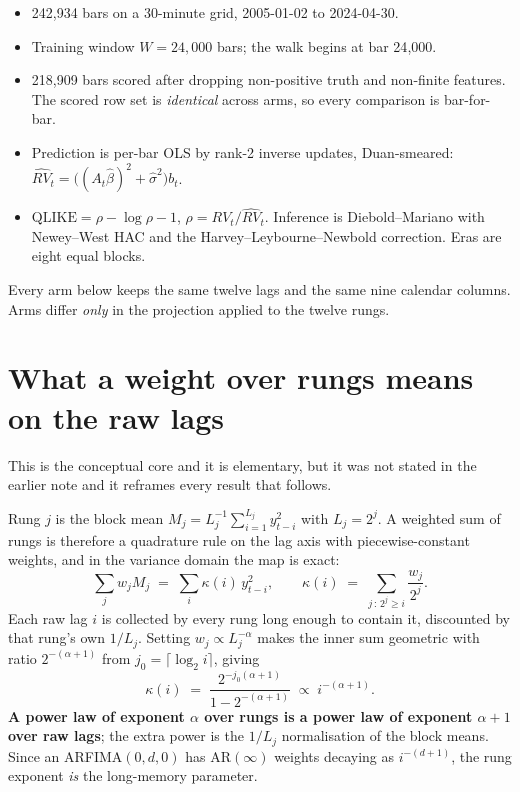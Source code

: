 \documentclass[11pt,a4paper]{article}
\begin{document}
\begin{itemize}\itemsep2pt
  \item 242{,}934 bars on a 30-minute grid, 2005-01-02 to 2024-04-30.
  \item Training window $W = 24{,}000$ bars; the walk begins at bar 24{,}000.
  \item 218{,}909 bars scored after dropping non-positive truth and
        non-finite features. The scored row set is \emph{identical} across
        arms, so every comparison is bar-for-bar.
  \item Prediction is per-bar OLS by rank-2 inverse updates, Duan-smeared:
        $\widehat{RV}_t = \big((A_t\hat\beta)^2 + \hat\sigma^2\big)b_t$.
  \item $\mathrm{QLIKE} = \rho - \log\rho - 1$, $\rho = RV_t/\widehat{RV}_t$.
        Inference is Diebold--Mariano with Newey--West HAC and the
        Harvey--Leybourne--Newbold correction. Eras are eight equal blocks.
\end{itemize}

Every arm below keeps the same twelve lags and the same nine calendar columns.
Arms differ \emph{only} in the projection applied to the twelve rungs.

\section{What a weight over rungs means on the raw lags}
\label{sec:kernel}

This is the conceptual core and it is elementary, but it was not stated in the
earlier note and it reframes every result that follows.

Rung $j$ is the block mean $M_j = L_j^{-1}\sum_{i=1}^{L_j} y^2_{t-i}$ with
$L_j = 2^j$. A weighted sum of rungs is therefore a quadrature rule on the lag
axis with piecewise-constant weights, and in the variance domain the map is
exact:
\[
  \sum_j w_j M_j \;=\; \sum_i \kappa(i)\, y^2_{t-i},
  \qquad
  \kappa(i) \;=\; \sum_{j\,:\,2^j \ge i} \frac{w_j}{2^j}.
\]
Each raw lag $i$ is collected by every rung long enough to contain it,
discounted by that rung's own $1/L_j$. Setting $w_j \propto L_j^{-\alpha}$
makes the inner sum geometric with ratio $2^{-(\alpha+1)}$ from
$j_0 = \lceil \log_2 i\rceil$, giving
\[
  \kappa(i) \;=\; \frac{2^{-j_0(\alpha+1)}}{1-2^{-(\alpha+1)}}
             \;\propto\; i^{-(\alpha+1)} .
\]
\textbf{A power law of exponent $\alpha$ over rungs is a power law of exponent
$\alpha+1$ over raw lags}; the extra power is the $1/L_j$ normalisation of the
block means. Since an ARFIMA$(0,d,0)$ has $\mathrm{AR}(\infty)$ weights
decaying as $i^{-(d+1)}$, the rung exponent \emph{is} the long-memory
parameter.
\end{document}
